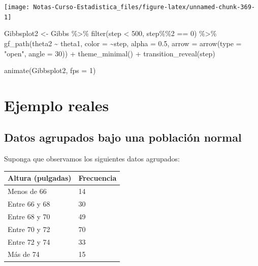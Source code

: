 \documentclass[
  12pt,
]{book}
\newenvironment{Shaded}{\begin{snugshade}}{\end{snugshade}}
\newcommand{\AttributeTok}[1]{\textcolor[rgb]{0.77,0.63,0.00}{#1}}
\newcommand{\DecValTok}[1]{\textcolor[rgb]{0.00,0.00,0.81}{#1}}
\newcommand{\FloatTok}[1]{\textcolor[rgb]{0.00,0.00,0.81}{#1}}
\newcommand{\FunctionTok}[1]{\textcolor[rgb]{0.00,0.00,0.00}{#1}}
\newcommand{\NormalTok}[1]{#1}
\newcommand{\OtherTok}[1]{\textcolor[rgb]{0.56,0.35,0.01}{#1}}
\newcommand{\SpecialCharTok}[1]{\textcolor[rgb]{0.00,0.00,0.00}{#1}}
\newcommand{\StringTok}[1]{\textcolor[rgb]{0.31,0.60,0.02}{#1}}
\theoremstyle{definition}
\theoremstyle{definition}
\theoremstyle{definition}
\theoremstyle{definition}
\theoremstyle{remark}
\begin{document}
\begin{center}\texttt{[image: Notas-Curso-Estadistica\_files/figure-latex/unnamed-chunk-369-1]} \end{center}

\begin{Shaded}
\begin{Highlighting}[]
\NormalTok{Gibbsplot2 }\OtherTok{\textless{}{-}}\NormalTok{ Gibbs }\SpecialCharTok{\%\textgreater{}\%}
    \FunctionTok{filter}\NormalTok{(step }\SpecialCharTok{\textless{}} \DecValTok{500}\NormalTok{, step}\SpecialCharTok{\%\%}\DecValTok{2} \SpecialCharTok{==} \DecValTok{0}\NormalTok{) }\SpecialCharTok{\%\textgreater{}\%}
    \FunctionTok{gf\_path}\NormalTok{(theta2 }\SpecialCharTok{\textasciitilde{}}\NormalTok{ theta1, }\AttributeTok{color =} \SpecialCharTok{\textasciitilde{}}\NormalTok{step, }\AttributeTok{alpha =} \FloatTok{0.5}\NormalTok{,}
        \AttributeTok{arrow =} \FunctionTok{arrow}\NormalTok{(}\AttributeTok{type =} \StringTok{"open"}\NormalTok{, }\AttributeTok{angle =} \DecValTok{30}\NormalTok{)) }\SpecialCharTok{+}
    \FunctionTok{theme\_minimal}\NormalTok{() }\SpecialCharTok{+} \FunctionTok{transition\_reveal}\NormalTok{(step)}

\FunctionTok{animate}\NormalTok{(Gibbsplot2, }\AttributeTok{fps =} \DecValTok{1}\NormalTok{)}
\end{Highlighting}
\end{Shaded}

\hypertarget{ejemplo-reales}{%
\section{Ejemplo reales}\label{ejemplo-reales}}

\hypertarget{datos-agrupados-bajo-una-poblaciuxf3n-normal}{%
\subsection{Datos agrupados bajo una población normal}\label{datos-agrupados-bajo-una-poblaciuxf3n-normal}}

Suponga que observamos los siguientes datos agrupados:

\begin{longtable}[]{@{}ll@{}}
\toprule()
Altura (pulgadas) & Frecuencia \\
\midrule()
\endhead
Menos de 66 & 14 \\
Entre 66 y 68 & 30 \\
Entre 68 y 70 & 49 \\
Entre 70 y 72 & 70 \\
Entre 72 y 74 & 33 \\
Más de 74 & 15 \\
\bottomrule()
\end{longtable}
\end{document}
